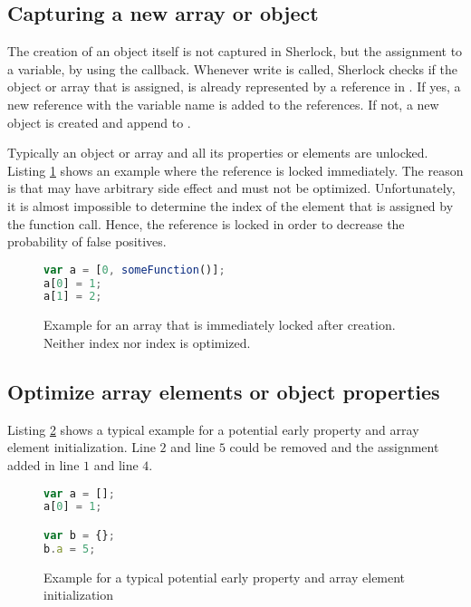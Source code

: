 \subsection{Capturing a new array or object}
The creation of an object itself is not captured in Sherlock, but the assignment to a variable, by using the  callback. Whenever write is called, Sherlock checks if the object or array that is assigned, is already represented by a reference in . If yes, a new reference with the variable name is added to the references. If not, a new  object is created and append to .

Typically an object or array and all its properties or elements are unlocked. Listing \ref{fig:array_lock} shows an example where the reference is locked immediately. The reason is that  may have arbitrary side effect and must not be optimized. Unfortunately, it is almost impossible to determine the index of the element that is assigned by the function call. Hence, the reference is locked in order to decrease the probability of false positives.

\begin{figure}[htbp]
\begin{lstlisting}[language=Javascript]
var a = [0, someFunction()];
a[0] = 1;
a[1] = 2;
\end{lstlisting}
\caption{Example for an array that is immediately locked after creation. Neither index  nor index  is optimized.}\label{fig:array_lock}
\end{figure}

\subsection{Optimize array elements or object properties}
Listing \ref{fig:field_example} shows a typical example for a potential early property and array element initialization. Line $2$ and line $5$ could be removed and the assignment added in line $1$ and line $4$.

\begin{figure}[htbp]
\begin{lstlisting}[language=Javascript]
var a = [];
a[0] = 1;

var b = {};
b.a = 5;
\end{lstlisting}
\caption{Example for a typical potential early property and array element initialization}\label{fig:field_example}
\end{figure}

